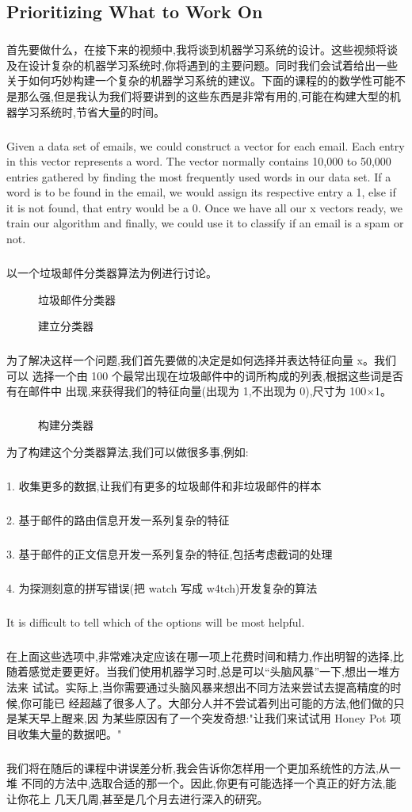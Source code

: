 \documentclass{article}
\begin{document}
\begin{CJK}{UTF8}{gbsn}
\subsection{Prioritizing What to Work On}
\subparagraph{}
首先要做什么，在接下来的视频中,我将谈到机器学习系统的设计。这些视频将谈及在设计复杂的机器学习系统时,你将遇到的主要问题。同时我们会试着给出一些关于如何巧妙构建一个复杂的机器学习系统的建议。下面的课程的的数学性可能不是那么强,但是我认为我们将要讲到的这些东西是非常有用的,可能在构建大型的机器学习系统时,节省大量的时间。
\subparagraph{}
Given a data set of emails, we could construct a vector for each email. Each entry in this vector represents a word. The vector normally contains 10,000 to 50,000 entries gathered by finding the most frequently used words in our data set. If a word is to be found in the email, we would assign its respective entry a 1, else if it is not found, that entry would be a 0. Once we have all our x vectors ready, we train our algorithm and finally, we could use it to classify if an email is a spam or not.
\subparagraph{}
以一个垃圾邮件分类器算法为例进行讨论。
\begin{figure}[H]
\label{fig:660}
\caption{垃圾邮件分类器}
\end{figure}
\begin{figure}[H]
\label{fig:661}
\caption{建立分类器}
\end{figure}
\subparagraph{}
为了解决这样一个问题,我们首先要做的决定是如何选择并表达特征向量 x。我们可以
选择一个由 100 个最常出现在垃圾邮件中的词所构成的列表,根据这些词是否有在邮件中
出现,来获得我们的特征向量(出现为 1,不出现为 0),尺寸为 100×1。
\subparagraph{}
\begin{figure}[H]
\label{fig:662}
\caption{构建分类器}
\end{figure}
为了构建这个分类器算法,我们可以做很多事,例如:
\subparagraph{}
1. 收集更多的数据,让我们有更多的垃圾邮件和非垃圾邮件的样本
\subparagraph{}
2. 基于邮件的路由信息开发一系列复杂的特征
\subparagraph{}
3. 基于邮件的正文信息开发一系列复杂的特征,包括考虑截词的处理
\subparagraph{}
4. 为探测刻意的拼写错误(把 watch 写成 w4tch)开发复杂的算法
\subparagraph{}
\begin{figure}[H]
\label{fig:671}
\end{figure}
It is difficult to tell which of the options will be most helpful.
\begin{figure}[H]
\label{fig:670}
\end{figure}
\subparagraph{}
在上面这些选项中,非常难决定应该在哪一项上花费时间和精力,作出明智的选择,比
随着感觉走要更好。当我们使用机器学习时,总是可以“头脑风暴”一下,想出一堆方法来
试试。实际上,当你需要通过头脑风暴来想出不同方法来尝试去提高精度的时候,你可能已
经超越了很多人了。大部分人并不尝试着列出可能的方法,他们做的只是某天早上醒来,因
为某些原因有了一个突发奇想:"让我们来试试用 Honey Pot 项目收集大量的数据吧。"
\subparagraph{}
我们将在随后的课程中讲误差分析,我会告诉你怎样用一个更加系统性的方法,从一堆
不同的方法中,选取合适的那一个。因此,你更有可能选择一个真正的好方法,能让你花上
几天几周,甚至是几个月去进行深入的研究。

\end{CJK}
\end{document}
